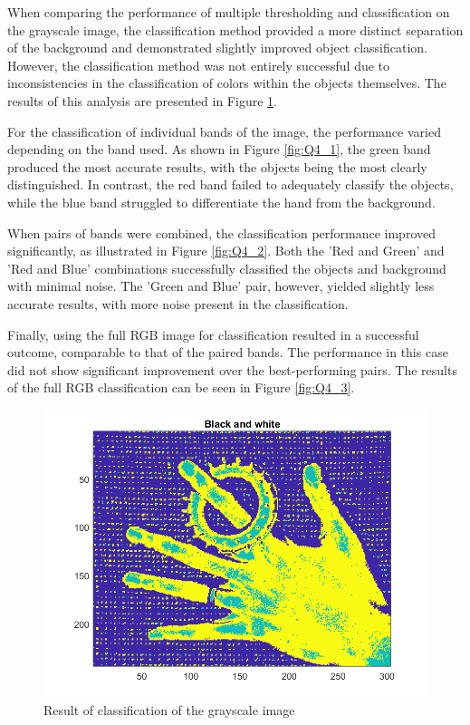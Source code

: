 \documentclass[12pt]{article}
\begin{document}
When comparing the performance of multiple thresholding and classification on the grayscale image, the classification method provided a more distinct separation of the background and demonstrated slightly improved object classification. However, the classification method was not entirely successful due to inconsistencies in the classification of colors within the objects themselves. The results of this analysis are presented in Figure \ref{fig:Q4_bw}.

For the classification of individual bands of the image, the performance varied depending on the band used. As shown in Figure \ref{fig:Q4_1}, the green band produced the most accurate results, with the objects being the most clearly distinguished. In contrast, the red band failed to adequately classify the objects, while the blue band struggled to differentiate the hand from the background.

When pairs of bands were combined, the classification performance improved significantly, as illustrated in Figure \ref{fig:Q4_2}. Both the 'Red and Green' and 'Red and Blue' combinations successfully classified the objects and background with minimal noise. The 'Green and Blue' pair, however, yielded slightly less accurate results, with more noise present in the classification.

Finally, using the full RGB image for classification resulted in a successful outcome, comparable to that of the paired bands. The performance in this case did not show significant improvement over the best-performing pairs. The results of the full RGB classification can be seen in Figure \ref{fig:Q4_3}.

\begin{figure}
  \centering
  \includegraphics[width = 15cm]{images/Q4_bw.png}
  \caption{Result of classification of the grayscale image}
  \label{fig:Q4_bw}
\end{figure}
\end{document}
